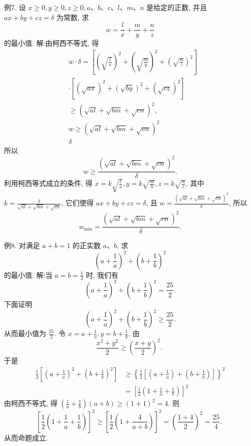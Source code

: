 例7. 设 $x \geqslant 0, y \geqslant 0, z \geqslant 0, a 、 b 、 c 、 l 、 m 、 n$ 是给定的正数, 并且 $a x+b y+c z=\delta$ 为常数, 求
$$
w=\frac{l}{x}+\frac{m}{y}+\frac{n}{z}
$$
的最小值.
解:由柯西不等式, 得
$$
\begin{aligned}
& w \cdot \delta= {\left[\left(\sqrt{\frac{l}{x}}\right)^2+\left(\sqrt{\frac{m}{y}}\right)^2+\left(\sqrt{\frac{n}{z}}\right)^2\right] } \\
& \cdot\left[(\sqrt{a x})^2+(\sqrt{b y})^2+(\sqrt{c z})^2\right] \\
& \geqslant(\sqrt{a l}+\sqrt{b m}+\sqrt{c n})^2, \\
& w \geqslant(\sqrt{a l}+\sqrt{b m}+\sqrt{c n})^2 \\
& \delta
\end{aligned}
$$
所以
$$
w \geqslant \frac{(\sqrt{a l}+\sqrt{b m}+\sqrt{c n})^2}{\delta} .
$$
利用柯西等式成立的条件, 得 $x=k \sqrt{\frac{l}{a}}, y=k \sqrt{\frac{m}{b}}, z=k \sqrt{\frac{n}{c}}$, 其中 $k=\frac{\delta}{\sqrt{a l}+\sqrt{b m}+\sqrt{c n}}$, 它们使得 $a x+b y+c z=\delta$, 且 $w= \frac{(\sqrt{a l}+\sqrt{b m}+\sqrt{c n})^2}{\delta}$, 所以
$$
w_{\min }=\frac{(\sqrt{a l}+\sqrt{b m}+\sqrt{c n})^2}{\delta} .
$$



例8. 对满足 $a+b=1$ 的正实数 $a 、 b$, 求
$$
\left(a+\frac{1}{a}\right)^2+\left(b+\frac{1}{b}\right)^2
$$
的最小值.
解:当 $a=b=\frac{1}{2}$ 时, 我们有
$$
\left(a+\frac{1}{a}\right)^2+\left(b+\frac{1}{b}\right)^2=\frac{25}{2} .
$$
下面证明
$$
\left(a+\frac{1}{a}\right)^2+\left(b+\frac{1}{b}\right)^2 \geqslant \frac{25}{2} .
$$
从而最小值为 $\frac{25}{2}$.
令 $x=a+\frac{1}{a}, y=b+\frac{1}{b}$, 由
$$
\frac{x^2+y^2}{2} \geqslant\left(\frac{x+y}{2}\right)^2 \text {. }
$$
于是
$$
\begin{aligned}
\frac{1}{2}\left[\left(a+\frac{1}{a}\right)^2+\left(b+\frac{1}{b}\right)^2\right] & \geqslant\left\{\frac{1}{2}\left[\left(a+\frac{1}{a}\right)+\left(b+\frac{1}{b}\right)\right]\right\}^2 \\
& =\left[\frac{1}{2}\left(1+\frac{1}{a}+\frac{1}{b}\right)\right]^2
\end{aligned}
$$
由柯西不等式, 得 $\left(\frac{1}{a}+\frac{1}{b}\right)(a+b) \geqslant(1+1)^2=4$. 则
$$
\left[\frac{1}{2}\left(1+\frac{1}{a}+\frac{1}{b}\right)\right]^2 \geqslant\left[\frac{1}{2}\left(1+\frac{4}{a+b}\right)\right]^2=\left(\frac{1+4}{2}\right)^2=\frac{25}{4} \text {. }
$$
从而命题成立.




